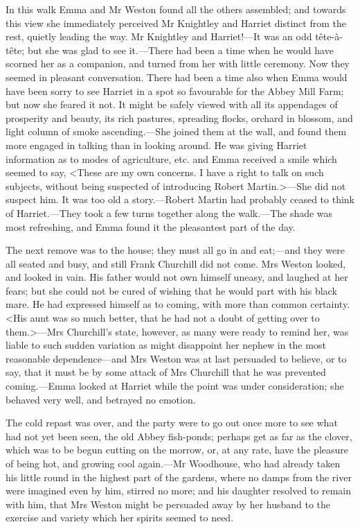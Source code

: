 In this walk Emma and Mr Weston found all the others assembled; and towards this view she immediately perceived Mr Knightley and Harriet distinct from the rest, quietly leading the way. Mr Knightley and Harriet!—It was an odd tête-à-tête; but she was glad to see it.—There had been a time when he would have scorned her as a companion, and turned from her with little ceremony. Now they seemed in pleasant conversation. There had been a time also when Emma would have been sorry to see Harriet in a spot so favourable for the Abbey Mill Farm; but now she feared it not. It might be safely viewed with all its appendages of prosperity and beauty, its rich pastures, spreading flocks, orchard in blossom, and light column of smoke ascending.—She joined them at the wall, and found them more engaged in talking than in looking around. He was giving Harriet information as to modes of agriculture, etc. and Emma received a smile which seemed to say, <These are my own concerns. I have a right to talk on such subjects, without being suspected of introducing Robert Martin.>—She did not suspect him. It was too old a story.—Robert Martin had probably ceased to think of Harriet.—They took a few turns together along the walk.—The shade was most refreshing, and Emma found it the pleasantest part of the day.

The next remove was to the house; they must all go in and eat;—and they were all seated and busy, and still Frank Churchill did not come. Mrs Weston looked, and looked in vain. His father would not own himself uneasy, and laughed at her fears; but she could not be cured of wishing that he would part with his black mare. He had expressed himself as to coming, with more than common certainty. <His aunt was so much better, that he had not a doubt of getting over to them.>—Mrs Churchill's state, however, as many were ready to remind her, was liable to such sudden variation as might disappoint her nephew in the most reasonable dependence—and Mrs Weston was at last persuaded to believe, or to say, that it must be by some attack of Mrs Churchill that he was prevented coming.—Emma looked at Harriet while the point was under consideration; she behaved very well, and betrayed no emotion.

The cold repast was over, and the party were to go out once more to see what had not yet been seen, the old Abbey fish-ponds; perhaps get as far as the clover, which was to be begun cutting on the morrow, or, at any rate, have the pleasure of being hot, and growing cool again.—Mr Woodhouse, who had already taken his little round in the highest part of the gardens, where no damps from the river were imagined even by him, stirred no more; and his daughter resolved to remain with him, that Mrs Weston might be persuaded away by her husband to the exercise and variety which her spirits seemed to need.

